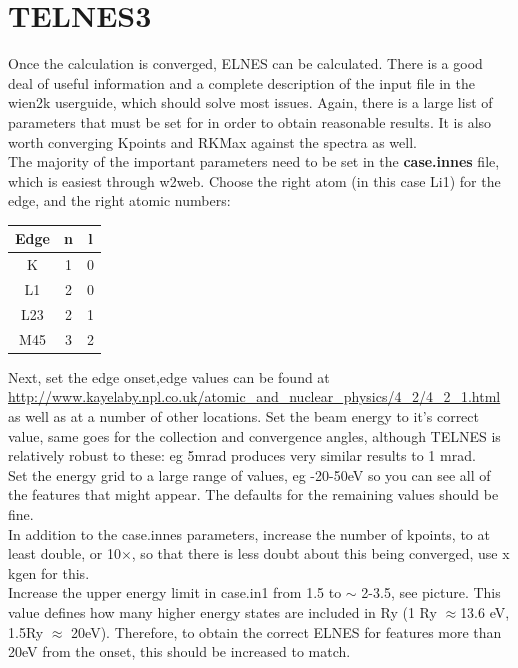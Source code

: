 \documentclass[12pt]{article}
\begin{document}
\section{TELNES3}

Once the calculation is converged, ELNES can be calculated.  There is a good deal of useful information and a complete description of the input file in the wien2k userguide, which should solve most issues. Again, there is a large list of parameters that must be set for in order to obtain reasonable results. It is also worth converging Kpoints and RKMax against the spectra as well.\\
The majority of the important parameters need to be set in the \textbf{case.innes} file, which is easiest through w2web.  Choose the right atom (in this case Li1) for the edge, and the right atomic numbers:  

\begin{table}[H]
	\centering
	\begin{tabular}{ccc}
		
		Edge & n & l \\
		\hline
		K & 1 &0 \\
		L1 & 2 & 0 \\
		L23 & 2 &1\\
		M45 & 3 & 2\\
	\end{tabular}
	
\end{table}

Next, set the edge onset,edge values can be found at \url{http://www.kayelaby.npl.co.uk/atomic_and_nuclear_physics/4_2/4_2_1.html} as well as at a number of other locations.  Set the beam energy to it's correct value, same goes for the collection and convergence angles, although TELNES is relatively robust to these: eg 5mrad produces very similar results to 1 mrad.\\

Set the energy grid to a large range of values, eg -20-50eV so you can see all of the features that might appear.  The defaults for the remaining values should be fine.\\

In addition to the case.innes parameters, increase the number of kpoints, to at least double, or 10$\times$, so that there is less doubt about this being converged, use x kgen for this.  \\

Increase the upper energy limit in case.in1 from 1.5 to $\sim$ 2-3.5, see picture.  This value defines how many higher energy states are included in Ry (1 Ry $\approx$13.6 eV, 1.5Ry $\approx$ 20eV). Therefore, to obtain the correct ELNES for features more than 20eV from the onset,  this should be increased to match.  \\
\end{document}
